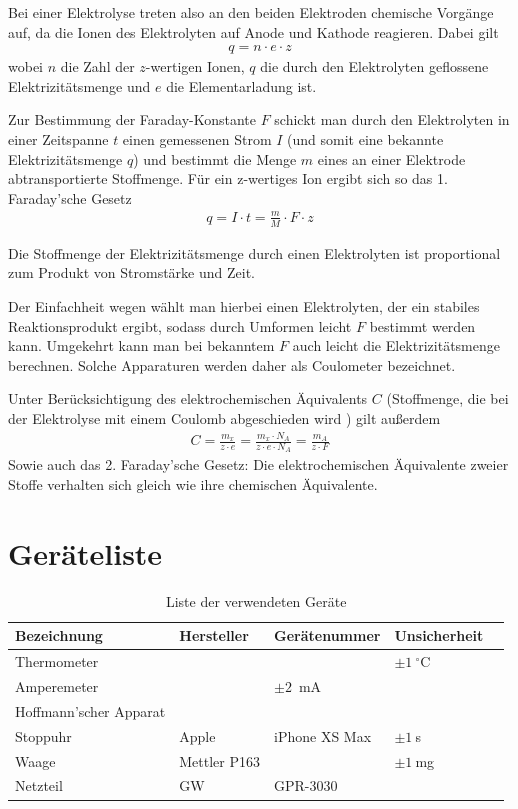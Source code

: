 \documentclass{article}
\begin{document}
Bei einer Elektrolyse treten also an den beiden Elektroden chemische Vorgänge auf, da die Ionen des Elektrolyten auf Anode und Kathode reagieren. Dabei gilt
\begin{align}
q = n\cdot e \cdot z
\end{align}
wobei $n$ die Zahl der $z$-wertigen Ionen, $q$ die durch den Elektrolyten geflossene Elektrizitätsmenge und $e$ die Elementarladung ist.

Zur Bestimmung der Faraday-Konstante $F$ schickt man durch den Elektrolyten in einer Zeitspanne $t$ einen gemessenen Strom $I$ (und somit eine bekannte Elektrizitätsmenge $q$) und bestimmt die Menge $m$ eines an einer Elektrode abtransportierte Stoffmenge. Für ein z-wertiges Ion ergibt sich so das 1. Faraday'sche Gesetz
\begin{align}
q = I\cdot t = \frac{m}{M} \cdot F \cdot z
\end{align}



Die Stoffmenge der Elektrizitätsmenge durch einen Elektrolyten ist proportional zum Produkt von Stromstärke und Zeit.

Der Einfachheit wegen wählt man hierbei einen Elektrolyten, der ein stabiles Reaktionsprodukt ergibt, sodass durch Umformen leicht $F$ bestimmt werden kann. Umgekehrt kann man bei bekanntem $F$ auch leicht die Elektrizitätsmenge berechnen. Solche Apparaturen werden daher als Coulometer bezeichnet.

Unter Berücksichtigung des elektrochemischen Äquivalents $C$ (Stoffmenge, die bei der Elektrolyse mit einem Coulomb abgeschieden wird \cite{chemie}) gilt außerdem
\begin{align}
C = \frac{m_x}{z\cdot e} = \frac{m_x\cdot N_A}{z\cdot e \cdot N_A} = \frac{m_A}{z\cdot F}
\end{align}
Sowie auch das 2. Faraday'sche Gesetz: Die elektrochemischen Äquivalente zweier Stoffe verhalten sich gleich wie ihre chemischen Äquivalente.





\section{Geräteliste}

\begin{table}[H]
\caption{Liste der verwendeten Geräte}

\begin{tabular}{l|llll}
Bezeichnung & Hersteller & Gerätenummer & Unsicherheit \\
\hline
Thermometer & & & $\pm 1~^\circ$C \\
Amperemeter & & $\pm 2$~mA \\
Hoffmann'scher Apparat  & & \\
Stoppuhr & Apple & iPhone XS Max & $\pm 1~$s \\
Waage & Mettler P163 &  & $\pm 1~$mg \\
Netzteil & GW & GPR-3030 & 
\end{tabular}

\end{table}
\end{document}
